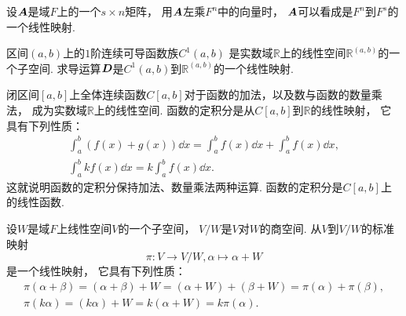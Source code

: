 \begin{example}
设\(\boldsymbol{A}\)是域\(F\)上的一个\(s \times n\)矩阵，
用\(\boldsymbol{A}\)左乘\(F^n\)中的向量时，
\(\boldsymbol{A}\)可以看成是\(F^n\)到\(F^s\)的一个线性映射.
\end{example}

\begin{example}
区间\((a,b)\)上的\(1\)阶连续可导函数族\(C^1(a,b)\)
是实数域\(\mathbb{R}\)上的线性空间\(\mathbb{R}^{(a,b)}\)的一个子空间.
求导运算\(\boldsymbol{D}\)是\(C^1(a,b)\)到\(\mathbb{R}^{(a,b)}\)的一个线性映射.
\end{example}

\begin{example}
闭区间\([a,b]\)上全体连续函数\(C[a,b]\)对于函数的加法，以及数与函数的数量乘法，
成为实数域\(\mathbb{R}\)上的线性空间.
函数的定积分是从\(C[a,b]\)到\(\mathbb{R}\)的线性映射，
它具有下列性质：\begin{gather*}
	\int_a^b (f(x) + g(x)) \dd{x}
	= \int_a^b f(x) \dd{x} + \int_a^b f(x) \dd{x}, \\
	\int_a^b k f(x) \dd{x}
	= k \int_a^b f(x) \dd{x}.
\end{gather*}
这就说明函数的定积分保持加法、数量乘法两种运算.
函数的定积分是\(C[a,b]\)上的线性函数.
\end{example}

\begin{example}
设\(W\)是域\(F\)上线性空间\(V\)的一个子空间，
\(V/W\)是\(V\)对\(W\)的商空间.
从\(V\)到\(V/W\)的标准映射\[
	\pi\colon V \to V/W,
	\alpha \mapsto \alpha+W
\]是一个线性映射，
它具有下列性质：\begin{gather*}
	\pi(\alpha+\beta)
	= (\alpha+\beta)+W
	= (\alpha+W) + (\beta+W)
	= \pi(\alpha) + \pi(\beta), \\
	\pi(k\alpha)
	= (k\alpha)+W
	= k(\alpha+W)
	= k\pi(\alpha).
\end{gather*}
\end{example}

